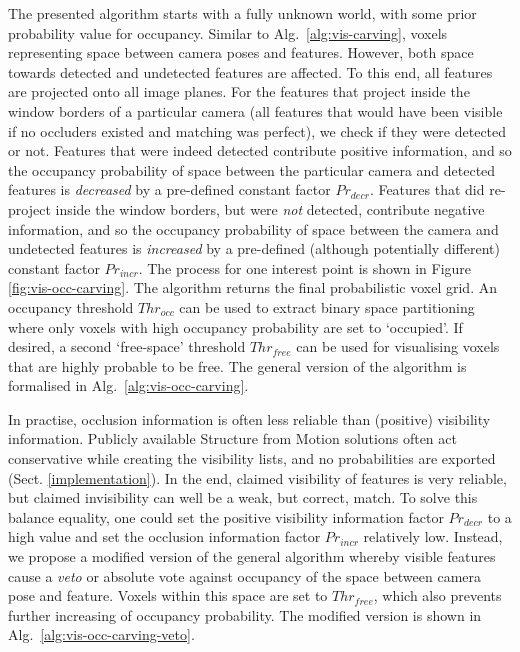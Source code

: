 The presented algorithm starts with a fully unknown world, with some prior probability value for occupancy. Similar to Alg.~\ref{alg:vis-carving}, voxels representing space between camera poses and features. However, both space towards detected and undetected features are affected. To this end, all features are projected onto all image planes. For the features that project inside the window borders of a particular camera (\ie all features that would have been visible if no occluders existed and matching was perfect), we check if they were detected or not. Features that were indeed detected contribute positive information, and so the occupancy probability of space between the particular camera and detected features is \emph{decreased} by a pre-defined constant factor $Pr_{decr}$. Features that did re-project inside the window borders, but were \emph{not} detected, contribute negative information, and so the occupancy probability of space between the camera and undetected features is \emph{increased} by a pre-defined (although potentially different) constant factor $Pr_{incr}$. The process for one interest point is shown in Figure \ref{fig:vis-occ-carving}. The algorithm returns the final probabilistic voxel grid. An occupancy threshold $Thr_{occ}$ can be used to extract binary space partitioning where only voxels with high occupancy probability are set to `occupied'. If desired, a second `free-space' threshold $Thr_{free}$ can be used for visualising voxels that are highly probable to be free. The general version of the algorithm is formalised in Alg.~\ref{alg:vis-occ-carving}.

In practise, occlusion information is often less reliable than (positive) visibility information. Publicly available Structure from Motion solutions often act conservative while creating the visibility lists, and no probabilities are exported (Sect. \ref{implementation}). In the end, claimed visibility of features is very reliable, but claimed invisibility can well be a weak, but correct, match. To solve this balance equality, one could set the positive visibility information factor $Pr_{decr}$ to a high value and set the occlusion information factor $Pr_{incr}$ relatively low. Instead, we propose a modified version of the general algorithm whereby visible features cause a \emph{veto} or absolute vote against occupancy of the space between camera pose and feature. Voxels within this space are set to $Thr_{free}$, which also prevents further increasing of occupancy probability. The modified version is shown in Alg.~\ref{alg:vis-occ-carving-veto}.


